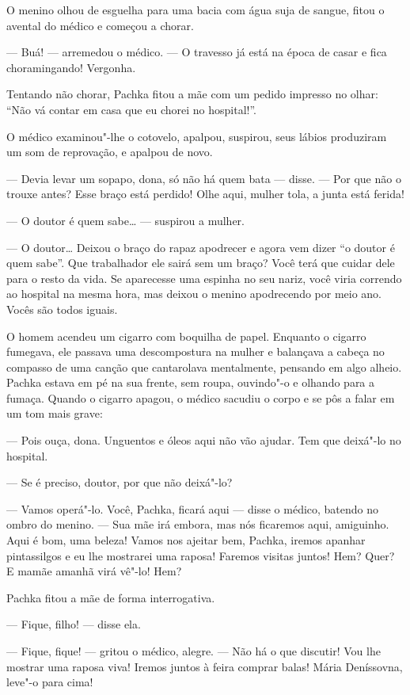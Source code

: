 O menino olhou de esguelha para uma bacia com água suja de sangue, fitou o
avental do médico e começou a chorar.

--- Buá! --- arremedou o médico. --- O travesso já está na época de
casar e fica choramingando! Vergonha.

Tentando não chorar, Pachka fitou a mãe com um pedido impresso no olhar:
``Não vá contar em casa que eu chorei no hospital!''.

O médico examinou"-lhe o cotovelo, apalpou, suspirou, seus lábios
produziram um som de reprovação, e apalpou de novo.

--- Devia levar um sopapo, dona, só não há quem bata --- disse. --- Por
que não o trouxe antes? Esse braço está perdido! Olhe aqui, mulher tola,
a junta está ferida!

--- O doutor é quem sabe\ldots{} --- suspirou a mulher.

--- O doutor\ldots{} Deixou o braço do rapaz apodrecer e agora vem dizer ``o
doutor é quem sabe''. Que trabalhador ele sairá sem um braço? Você terá
que cuidar dele para o resto da vida. Se aparecesse uma espinha no seu
nariz, você viria correndo ao hospital na mesma hora, mas deixou o
menino apodrecendo por meio ano. Vocês são todos iguais.

O homem acendeu um cigarro com boquilha de papel. Enquanto o
cigarro fumegava, ele passava uma descompostura na mulher e balançava a
cabeça no compasso de uma canção que cantarolava mentalmente, pensando
em algo alheio. Pachka estava em pé na sua frente, sem
roupa, ouvindo"-o e olhando para a fumaça. Quando o cigarro apagou, o
médico sacudiu o corpo e se pôs a falar em um tom mais grave:

--- Pois ouça, dona. Unguentos e óleos aqui não vão ajudar. Tem que
deixá"-lo no hospital.

--- Se é preciso, doutor, por que não deixá"-lo?

--- Vamos operá"-lo. Você, Pachka, ficará aqui --- disse o médico,
batendo no ombro do menino. --- Sua mãe irá embora, mas nós ficaremos
aqui, amiguinho. Aqui é bom, uma beleza! Vamos nos ajeitar bem, Pachka,
iremos apanhar pintassilgos e eu lhe mostrarei uma raposa! Faremos
visitas juntos! Hem? Quer? E mamãe amanhã virá vê"-lo! Hem?

Pachka fitou a mãe de forma interrogativa.

--- Fique, filho! --- disse ela.

--- Fique, fique! --- gritou o médico, alegre. --- Não há o que
discutir! Vou lhe mostrar uma raposa viva! Iremos juntos à feira comprar
balas! Mária Deníssovna, leve"-o para cima!

